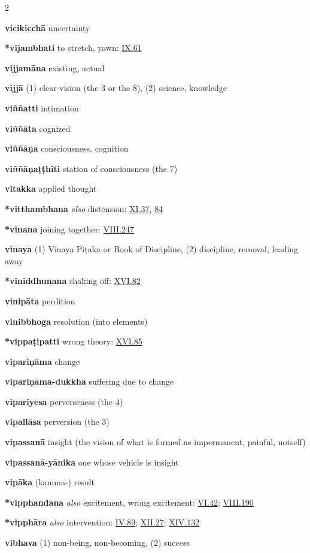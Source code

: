 \begin{multicols}{2}
\begin{vismHanging}
\par\textbf{vicikicchā} uncertainty
\par\textbf{*vijambhati} to stretch, yawn: \hyperlink{IX.61}{IX.61}{}
\par\textbf{vijjamāna} existing, actual
\par\textbf{vijjā} (1) clear-vision (the 3 or the 8), (2) science, knowledge 
\par\textbf{viññatti} intimation
\par\textbf{viññāta} cognized
\par\textbf{viññāṇa} consciousness, cognition
\par\textbf{viññāṇaṭṭhiti} station of consciousness (the 7) 
\par\textbf{vitakka} applied thought
\par\textbf{*vitthambhana} \emph{also }distension: \hyperlink{XI.37}{XI.37}{}, \hyperlink{XI.84}{84}{}
\par\textbf{*vinana} joining together: \hyperlink{VIII.247}{VIII.247}{}
\par\textbf{vinaya} (1) Vinaya Piṭaka or Book of Discipline, (2) discipline, removal, leading away 
\par\textbf{*viniddhunana} shaking off: \hyperlink{XVI.82}{XVI.82}{}
\par\textbf{vinipāta} perdition
\par\textbf{vinibbhoga} resolution (into elements)
\par\textbf{*vippaṭipatti} wrong theory: \hyperlink{XVI.85}{XVI.85}{}
\par\textbf{vipariṇāma} change
\par\textbf{vipariṇāma-dukkha} suffering due to change 
\par\textbf{vipariyesa} perverseness (the 4)
\par\textbf{vipallāsa} perversion (the 3)
\par\textbf{vipassanā} insight (the vision of what is formed as impermanent, painful, notself) 
\par\textbf{vipassanā-yānika} one whose vehicle is insight 
\par\textbf{vipāka} (kamma-) result
\par\textbf{*vipphandana} \emph{also }excitement, wrong excitement: \hyperlink{VI.42}{VI.42}{}; \hyperlink{VIII.190}{VIII.190}{} 
\par\textbf{*vipphāra} \emph{also }intervention: \hyperlink{IV.89}{IV.89}{}; \hyperlink{XII.27}{XII.27}{}; \hyperlink{XIV.132}{XIV.132}{} 
\par\textbf{vibhava} (1) non-being, non-becoming, (2) success 

\end{vismHanging}
\end{multicols}
